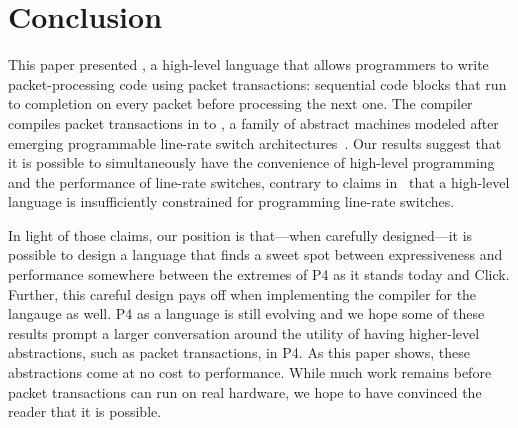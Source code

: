 \section{Conclusion}
\label{s:conclusion}

This paper presented \pktlanguage, a high-level language that allows
programmers to write packet-processing code using packet transactions:
sequential code blocks that run to completion on every packet before processing
the next one. The \pktlanguage compiler compiles packet transactions in
\pktlanguage to \absmachine, a family of abstract machines modeled after
emerging programmable line-rate switch architectures~\cite{flexpipe, xpliant,
rmt}. Our results suggest that it is possible to simultaneously have the
convenience of high-level programming and the performance of line-rate
switches, contrary to claims in~\cite{p4} that a high-level language is
insufficiently constrained for programming line-rate switches.

In light of those claims, our position is that---when carefully designed---it
is possible to design a language that finds a sweet spot between expressiveness
and performance somewhere between the extremes of P4 as it stands today and
Click. Further, this careful design pays off when implementing the compiler for
the langauge as well. P4 as a language is still evolving and we hope some of
these results prompt a larger conversation around the utility of having
higher-level abstractions, such as packet transactions, in P4. As this paper shows,
these abstractions come at no cost to performance. While much work remains
before packet transactions can run on real hardware, we hope to have convinced
the reader that it is possible.
